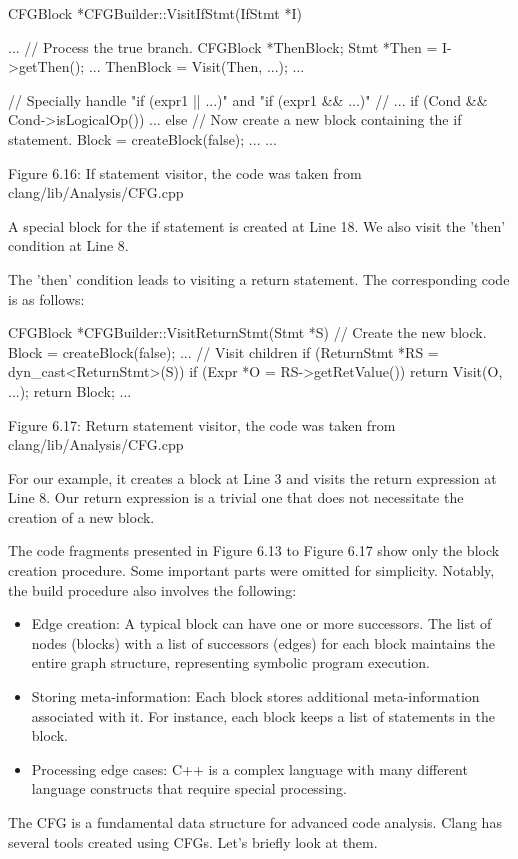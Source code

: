 \begin{cpp}
CFGBlock *CFGBuilder::VisitIfStmt(IfStmt *I) {
  ...
  // Process the true branch.
  CFGBlock *ThenBlock;
  {
    Stmt *Then = I->getThen();
    ...
    ThenBlock = Visit(Then, ...);
    ...
  }

  // Specially handle "if (expr1 || ...)" and "if (expr1 && ...)"
  // ...
  if (Cond && Cond->isLogicalOp())
    ...
  else {
    // Now create a new block containing the if statement.
    Block = createBlock(false);
    ...
  }
  ...
}
\end{cpp}


\begin{center}
Figure 6.16: If statement visitor, the code was taken from clang/lib/Analysis/CFG.cpp
\end{center}

A special block for the if statement is created at Line 18. We also visit the 'then' condition at Line 8.

The 'then' condition leads to visiting a return statement. The corresponding code is as follows:

\begin{cpp}
CFGBlock *CFGBuilder::VisitReturnStmt(Stmt *S) {
  // Create the new block.
  Block = createBlock(false);
  ...
  // Visit children
  if (ReturnStmt *RS = dyn_cast<ReturnStmt>(S)) {
    if (Expr *O = RS->getRetValue())
      return Visit(O, ...);
    return Block;
  }
  ...
}
\end{cpp}

\begin{center}
Figure 6.17: Return statement visitor, the code was taken from clang/lib/Analysis/CFG.cpp
\end{center}

For our example, it creates a block at Line 3 and visits the return expression at Line 8. Our return expression is a trivial one that does not necessitate the creation of a new block.

The code fragments presented in Figure 6.13 to Figure 6.17 show only the block creation procedure. Some important parts were omitted for simplicity. Notably, the build procedure also involves the following:

\begin{itemize}
\item
Edge creation: A typical block can have one or more successors. The list of nodes (blocks) with a list of successors (edges) for each block maintains the entire graph structure, representing symbolic program execution.

\item
Storing meta-information: Each block stores additional meta-information associated with it. For instance, each block keeps a list of statements in the block.

\item
Processing edge cases: C++ is a complex language with many different language constructs that require special processing.
\end{itemize}

The CFG is a fundamental data structure for advanced code analysis. Clang has several tools created using CFGs. Let's briefly look at them.

















